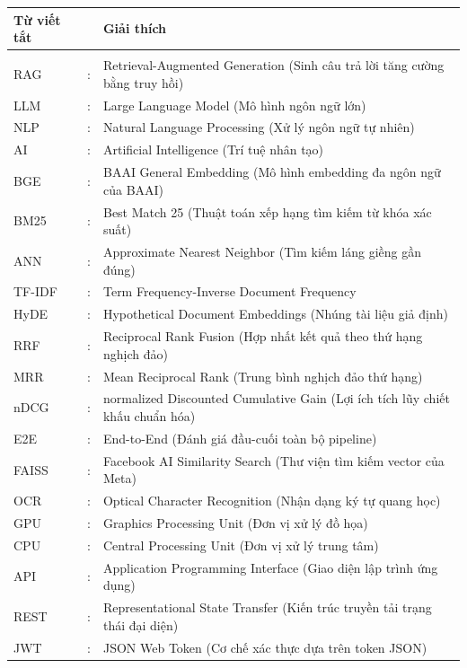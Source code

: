 \documentclass[a4paper,13pt,3p,twoside]{report}
\theoremstyle{definition}
\begin{document}
\noindent
\begin{tabular}{p{2.8cm} p{1.0cm} p{10.5cm}}
\textbf{Từ viết tắt} & & \textbf{Giải thích} \\[6pt]
\hline \\[-4pt]
RAG  & : & Retrieval-Augmented Generation (Sinh câu trả lời tăng cường bằng truy hồi) \\[4pt]
LLM  & : & Large Language Model (Mô hình ngôn ngữ lớn) \\[4pt]
NLP  & : & Natural Language Processing (Xử lý ngôn ngữ tự nhiên) \\[4pt]
AI   & : & Artificial Intelligence (Trí tuệ nhân tạo) \\[4pt]
BGE  & : & BAAI General Embedding (Mô hình embedding đa ngôn ngữ của BAAI) \\[4pt]
BM25 & : & Best Match 25 (Thuật toán xếp hạng tìm kiếm từ khóa xác suất) \\[4pt]
ANN  & : & Approximate Nearest Neighbor (Tìm kiếm láng giềng gần đúng) \\[4pt]
TF-IDF & : & Term Frequency-Inverse Document Frequency \\[4pt]
HyDE & : & Hypothetical Document Embeddings (Nhúng tài liệu giả định) \\[4pt]
RRF  & : & Reciprocal Rank Fusion (Hợp nhất kết quả theo thứ hạng nghịch đảo) \\[4pt]
MRR  & : & Mean Reciprocal Rank (Trung bình nghịch đảo thứ hạng) \\[4pt]
nDCG & : & normalized Discounted Cumulative Gain (Lợi ích tích lũy chiết khấu chuẩn hóa) \\[4pt]
E2E  & : & End-to-End (Đánh giá đầu-cuối toàn bộ pipeline) \\[4pt]
FAISS & : & Facebook AI Similarity Search (Thư viện tìm kiếm vector của Meta) \\[4pt]
OCR  & : & Optical Character Recognition (Nhận dạng ký tự quang học) \\[4pt]
GPU  & : & Graphics Processing Unit (Đơn vị xử lý đồ họa) \\[4pt]
CPU  & : & Central Processing Unit (Đơn vị xử lý trung tâm) \\[10pt]
API  & : & Application Programming Interface (Giao diện lập trình ứng dụng) \\[4pt]
REST & : & Representational State Transfer (Kiến trúc truyền tải trạng thái đại diện) \\[4pt]
JWT  & : & JSON Web Token (Cơ chế xác thực dựa trên token JSON) \\[4pt]

\end{tabular}
\end{document}

